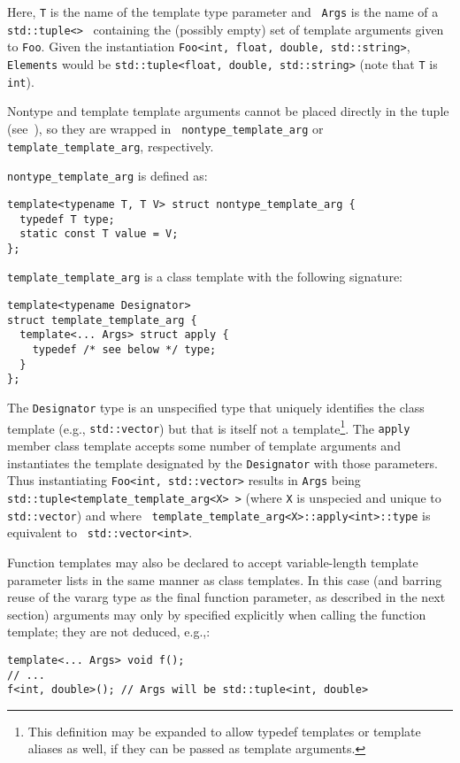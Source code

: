 \documentclass{article}
\begin{document}
Here, {\tt T} is the name of the template type parameter and {\tt
  Args} is the name of a {\tt std::tuple<>}~\cite{Jarvi02} containing
the (possibly empty) set of template arguments given to {\tt Foo}.
Given the instantiation {\tt Foo<int, float, double, std::string>},
{\tt Elements} would be {\tt std::tuple<float, double, std::string>}
(note that {\tt T} is {\tt int}). 

Nontype and template template arguments cannot be placed directly in
the tuple (see~\cite{Jarvi02}), so they are wrapped in {\tt
  nontype\_template\_arg} or {\tt template\_template\_arg}, respectively. 

{\tt nontype\_template\_arg} is defined as:
\begin{verbatim}
template<typename T, T V> struct nontype_template_arg {
  typedef T type;
  static const T value = V; 
};
\end{verbatim}

{\tt template\_template\_arg} is a class template with the following
signature: 
\begin{verbatim}
template<typename Designator>
struct template_template_arg {
  template<... Args> struct apply {
    typedef /* see below */ type;
  }
};
\end{verbatim}

The {\tt Designator} type is an unspecified type that uniquely
identifies the class template (e.g., {\tt std::vector}) but that is
itself not a template\footnote{This definition may be expanded to
  allow typedef templates or template aliases as well, if they can be
  passed as template arguments.}. The {\tt apply} member class
template accepts some number of template arguments and instantiates
the template designated by the {\tt Designator} with those parameters.
Thus instantiating {\tt Foo<int, std::vector>} results in {\tt Args}
being {\tt std::tuple<template\_template\_arg<X> >} (where {\tt X} is
unspecied and unique to {\tt std::vector}) and where {\tt
  template\_template\_arg<X>::apply<int>::type} is equivalent to {\tt
  std::vector<int>}.

Function templates may also be declared to accept variable-length
template parameter lists in the same manner as class templates. In
this case (and barring reuse of the vararg type as the final function
parameter, as described in the next section) arguments may only by
specified explicitly when calling the function template; they are not
deduced, e.g.,:

\begin{verbatim}
template<... Args> void f();
// ... 
f<int, double>(); // Args will be std::tuple<int, double>
\end{verbatim}
\end{document}
